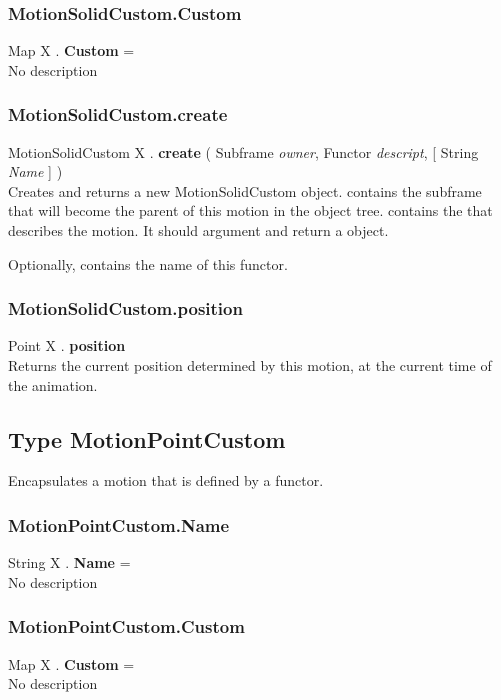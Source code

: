 \subsubsection{MotionSolidCustom.Custom \label{F:MotionSolidCustom:Custom}}
Map X . \textbf{Custom} = \\
No description

\subsubsection{MotionSolidCustom.create \label{F:MotionSolidCustom:create}}
MotionSolidCustom X . \textbf{create} ( Subframe \textit{owner}, Functor \textit{descript},  [ String \textit{Name} ] ) \\
Creates and returns a new MotionSolidCustom object.  contains the subframe that will become the parent of this motion in the object tree.  contains the  that describes the motion. It should  argument and return a  object.

Optionally,  contains the name of this functor.

\subsubsection{MotionSolidCustom.position \label{F:MotionSolidCustom:position}}
Point X . \textbf{position} \\
Returns the current position determined by this motion, at the current time of the animation.


\subsection{Type MotionPointCustom \label{T:MotionPointCustom}}
Encapsulates a motion that is defined by a functor.

\subsubsection{MotionPointCustom.Name \label{F:MotionPointCustom:Name}}
String X . \textbf{Name} = \\
No description

\subsubsection{MotionPointCustom.Custom \label{F:MotionPointCustom:Custom}}
Map X . \textbf{Custom} = \\
No description

